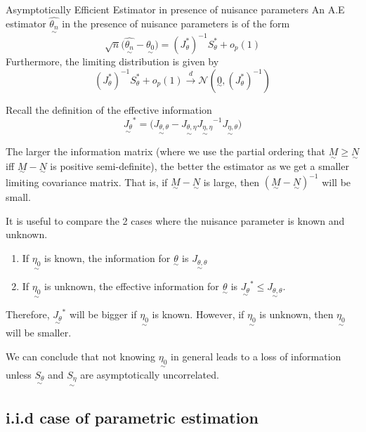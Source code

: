 \documentclass[twoside]{article}
\newcommand{\utilde}{\underset{\sim}}
\begin{document}
\begin{definition_exam}{Asymptotically Efficient Estimator in presence of nuisance parameters}{}
An A.E estimator $\hat{\utilde{\theta_{n}}}$ in the presence of nuisance parameters is of the form 
\begin{equation}
\sqrt{n}\big(\hat{\utilde{\theta_{n}}} - \utilde{\theta_{0}} \big) = (J_{\theta}^{*})^{-1}S_{\theta}^{*} + o_p(1)
\end{equation}
Furthermore, the limiting distribution is given by 
$$
(J_{\theta}^{*})^{-1}S_{\theta}^{*} + o_p(1) \xrightarrow{d} \mathcal{N}(\utilde{0}, (J_{\theta}^{*})^{-1})
$$
\end{definition_exam}

Recall the definition of the effective information 
$$
\utilde{J_{\theta}}^{*} = \bigg(\utilde{J_{\theta, \theta}} - \utilde{J_{\theta, \eta}}\utilde{J_{\eta, \eta}}^{-1}\utilde{J_{\eta, \theta}}\bigg)
$$

The larger the information matrix (where we use the partial ordering that $\utilde{M} \geq \utilde{N}$ iff $\utilde{M} - \utilde{N}$ is positive semi-definite), the better the estimator as we get a smaller limiting covariance matrix. That is, if $\utilde{M} - \utilde{N}$ is large, then $(\utilde{M} - \utilde{N})^{-1}$ will be small.

It is useful to compare the 2 cases where the nuisance parameter is known and unknown. 

\begin{enumerate}
    \item If $\utilde{\eta_{0}}$ is known, the information for $\utilde{\theta}$ is $\utilde{J_{\theta, \theta}}$
    \item If $\utilde{\eta_{0}}$ is unknown, the effective information for $\utilde{\theta}$ is $\utilde{J_{\theta}}^{*} \leq \utilde{J_{\theta, \theta}}.$
\end{enumerate}

Therefore, $\utilde{J_{\theta}}^{*}$ will be bigger if $\utilde{\eta_{0}}$ is known. However, if $\utilde{\eta_{0}}$ is unknown, then $\utilde{\eta_{0}}$ will be smaller.


We can conclude that not knowing $\utilde{\eta_{0}}$ in general leads to a loss of information unless $\utilde{S_{\theta}}$ and $\utilde{S_{\eta}}$ are asymptotically uncorrelated.

\subsection{i.i.d case of parametric estimation}
\end{document}
